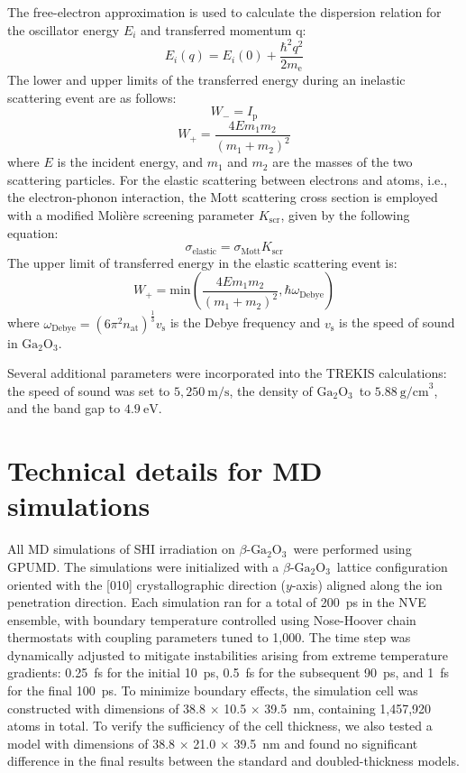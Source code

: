 \documentclass[aip,graphicx,amsmath,amssymb]{revtex4-1}
\newcommand{\ga}{$\text{Ga}_2\text{O}_3$}
\begin{document}
The free-electron approximation is used to calculate the dispersion relation 
for the oscillator energy $E_{i}$ and transferred momentum q: 
\begin{equation} 
E_{i}(q) = E_{i}(0) + \frac{\hbar^{2}q^{2}}{2m_{\text{e}}} 
\end{equation} 
The lower and upper limits of the transferred energy during an inelastic 
scattering event are as follows: 
\begin{equation} 
W_{-} = I_{\text{p}} 
\end{equation} 
\begin{equation} 
W_{+} = \frac{4Em_{1}m_{2}}{(m_{1}+m_{2})^{2}} 
\end{equation} 
where $E$ is the incident energy, and $m_{1}$ and $m_{2}$ are the masses of the 
two scattering particles. 
For the elastic scattering between electrons and atoms, i.e., the 
electron-phonon interaction, the Mott scattering cross section is employed with 
a modified Moli\`ere screening parameter $K_{\text{scr}}$,\cite{Jenkins2012} given 
by the following equation: 
\begin{equation} 
\sigma_{\text{elastic}} = \sigma_{\text{Mott}}K_{\text{scr}} 
\end{equation} 
The upper limit of transferred energy in the elastic scattering event is: 
\begin{equation} 
W_{+} = \mathrm{min}(\frac{4Em_{1}m_{2}}{(m_{1}+m_{2})^{2}}, 
\hbar\omega_{\text{Debye}}) 
\end{equation} 
where $\omega_{\text{Debye}}=(6\pi^{2}n_{\text{at}})^{\frac{1}{3}}v_{\text{s}}$ is the Debye 
frequency and $v_{\text{s}}$ is the speed of sound in \ga. 
 
Several additional parameters were incorporated into the TREKIS calculations: 
the speed of sound was set to $5,250~\mathrm{m/s}$,\cite{wright_acoustic_2025} the density 
of \ga\ to $5.88~\mathrm{g/cm}^3$, and the band gap to 
$4.9~\mathrm{eV}$.\cite{zhang_tight-binding_2022} 

\section{Technical details for MD simulations}
\label{app:md}
All MD simulations of SHI irradiation on $\beta$-\ga\ were performed using GPUMD. 
The simulations were initialized with a $\beta$-\ga\ lattice configuration oriented with the 
[010] crystallographic direction ($y$-axis) aligned along the ion penetration direction. 
Each simulation ran for a total of 200~ps in the NVE ensemble, with boundary temperature 
controlled using Nose-Hoover chain thermostats with coupling parameters tuned to 1,000. 
The time step was dynamically adjusted to mitigate instabilities arising from extreme 
temperature gradients: 0.25~fs for the initial 10~ps, 0.5~fs for the subsequent 90~ps, 
and 1~fs for the final 100~ps. 
To minimize boundary effects, the simulation cell was constructed with dimensions of 
38.8 $\times$ 10.5 $\times$ 39.5~nm, containing 1,457,920 atoms in total. 
To verify the sufficiency of the cell thickness, we also tested a model with dimensions of 
38.8 $\times$ 21.0 $\times$ 39.5~nm and found no significant difference in the final 
results between the standard and doubled-thickness models. 

\end{document}
